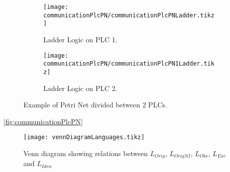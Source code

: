 \begin{figure}[H]
    \centering
    \begin{subfigure}[t]{0.45\textwidth}
        \centering
        \texttt{[image: communicationPlcPN/communicationPlcPNLadder.tikz]}
        \caption{Ladder Logic on PLC 1.}
        \label{fig:communicationPlcPN}
    \end{subfigure}%
\hfill
    \begin{subfigure}[t]{0.45\textwidth}
        \centering
        \texttt{[image: communicationPlcPN/communicationPlcPN1Ladder.tikz]}
  \caption{Ladder Logic on PLC 2.}
  \label{fig:communicationPlcPN1}
    \end{subfigure}
    \caption{Example of Petri Net divided between 2 PLCs.}
\end{figure}
  

\autoref{fig:communicationPlcPN}






\usetikzlibrary{patterns}
\begin{figure}[H]
  \centering
  \texttt{[image: vennDiagramLanguages.tikz]}
  \caption{Venn diagram showing relations between $L_{Orig}$, $L_{OrigNI}$,
    $L_{Obs}$, $L_{Exc}$ and $L_{Iden}$}
\end{figure}


